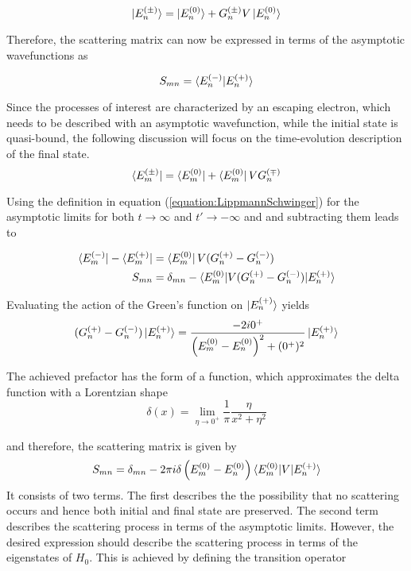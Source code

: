 \begin{equation} \label{equation:LippmannSchwinger}
 \ket{E_n^{(\pm)}} =  \ket{E_n^{(0)}} + G_n^{(\pm)}V \ket{E_n^{(0)}}
\end{equation}

Therefore, the scattering matrix can now be expressed in terms of the asymptotic
wavefunctions as

\begin{equation}
 S_{mn} = \braket{E_n^{(-)} | E_n^{(+)}}
\end{equation}

Since the processes of interest are characterized by an escaping electron,
which needs to be described with an asymptotic wavefunction, while the initial
state is quasi-bound, the following discussion will focus on the time-evolution
description of the final state.
\begin{equation}
 \bra{E_m^{(\pm)}} = \bra{E_m^{(0)}} + \bra{E_m^{(0)}} V G_n^{(\mp)}
\end{equation}

Using the definition in equation (\ref{equation:LippmannSchwinger})
for the asymptotic limits for both $t\rightarrow \infty$ and
$t' \rightarrow - \infty$ and and subtracting them leads to 

\begin{align}
  \bra{E_m^{(-)}} - \bra{E_m^{(+)}} &= \bra{E_m^{(0)}} V (G_n^{(+)} - G_n^{(-)} ) \\
  S_{mn} &= \delta_{mn} - \braket{E_m^{(0)}| V (G_n^{(+)} - G_n^{(-)}) |E_n^{(+)}} 
\end{align}

Evaluating the action of the Green's function on $\ket{E_n^{(+)}}$ yields
\begin{equation}
 (G_n^{(+)} - G_n^{(-)}) \ket{E_n^{(+)}} 
 = \frac{-2i0^+}{\left( E_m^{(0)} - E_n^{(0)} \right)^2 + (0^+)^2} \ket{E_n^{(+)}}
\end{equation}


The achieved prefactor has the form of a function, which approximates the delta
function with a Lorentzian shape
\begin{equation}
 \delta(x) = \lim_{\eta \to 0^+} \frac{1}{\pi} \frac{\eta}{x^2 + \eta^2}
\end{equation}

and therefore, the scattering matrix is given by
\begin{equation}
 S_{mn} = \delta_{mn} - 2\pi i \delta \left(E_m^{(0)} - E_n^{(0)} \right)
          \braket{E_m^{(0)}| V |E_n^{(+)}}
\end{equation}
It consists of two terms. The first describes the the possibility that no scattering
occurs and hence both initial and final state are preserved. The second term
describes the scattering process in terms of the asymptotic limits. However,
the desired expression should describe the scattering process in terms of the
eigenstates of $H_0$. This is achieved by defining the transition operator

